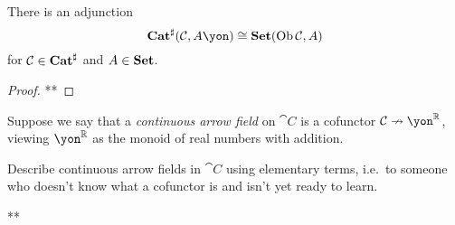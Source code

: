 \documentclass[Book-Poly]{subfiles}
\begin{document}
\begin{proposition}
There is an adjunction
\[
\smcat^\sharp(\cat{C},A\yon)\cong\smset(\Ob\cat{C},A)
\]
for $\mathcal{C}\in\mathbf{Cat}^\sharp$ and $A\in\mathbf{Set}$.
\end{proposition}
\begin{proof}
**
\end{proof}

\begin{exercise}
Suppose we say that a \emph{continuous arrow field} on $\cat{C}$ is a cofunctor $\cat{C}\cof\yon^\rr$, viewing $\yon^\rr$ as the monoid of real numbers with addition.

Describe continuous arrow fields in $\cat{C}$ using elementary terms, i.e.\ to someone who doesn't know what a cofunctor is and isn't yet ready to learn.
\begin{solution}
**
\end{solution}
\end{exercise}
\end{document}
